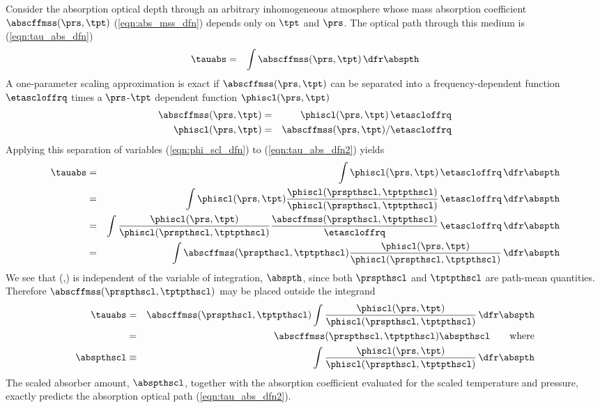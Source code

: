 \documentclass[12pt]{article}
\begin{document}
Consider the absorption optical depth through an arbitrary
inhomogeneous atmosphere whose mass absorption coefficient
$\abscffmss(\prs,\tpt)$ (\ref{eqn:abs_mss_dfn}) depends only on $\tpt$ 
and $\prs$. 
The optical path through this medium is (\ref{eqn:tau_abs_dfn})
\begin{eqnarray}
\tauabs & = & \int \abscffmss(\prs,\tpt) \,\dfr\abspth
\label{eqn:tau_abs_dfn2}
\end{eqnarray}
A one-parameter scaling approximation is exact if
$\abscffmss(\prs,\tpt)$ can be separated into a frequency-dependent
function $\etascloffrq$ times a $\prs$-$\tpt$ dependent function
$\phiscl(\prs,\tpt)$ \cite[][p.~224]{GoY89}
\begin{eqnarray}
\abscffmss(\prs,\tpt) & = & \phiscl(\prs,\tpt) \, \etascloffrq \nonumber \\
\phiscl(\prs,\tpt) & = & \abscffmss(\prs,\tpt) / \etascloffrq
\label{eqn:phi_scl_dfn}
\end{eqnarray}
Applying this separation of variables (\ref{eqn:phi_scl_dfn}) to
(\ref{eqn:tau_abs_dfn2}) yields
\begin{eqnarray}
\tauabs & = & \int \phiscl(\prs,\tpt) \, \etascloffrq \,\dfr\abspth \nonumber \\
& = & \int \phiscl(\prs,\tpt) 
\frac{\phiscl(\prspthscl,\tptpthscl)}{\phiscl(\prspthscl,\tptpthscl)}
\, \etascloffrq \,\dfr\abspth
\nonumber \\
& = & \int 
\frac{\phiscl(\prs,\tpt)}{\phiscl(\prspthscl,\tptpthscl)}
\frac{\abscffmss(\prspthscl,\tptpthscl)}{\etascloffrq}
\, \etascloffrq \,\dfr\abspth
\nonumber \\
& = & \int 
\abscffmss(\prspthscl,\tptpthscl)
\frac{\phiscl(\prs,\tpt)}{\phiscl(\prspthscl,\tptpthscl)}
\,\dfr\abspth \nonumber
\end{eqnarray}
We see that \abscffmss(\prspthscl,\tptpthscl) is independent of the 
variable of integration, $\abspth$, since both $\prspthscl$ and
$\tptpthscl$ are path-mean quantities.
Therefore $\abscffmss(\prspthscl,\tptpthscl)$ may be placed outside
the integrand 
\begin{eqnarray}
\tauabs
& = & 
\abscffmss(\prspthscl,\tptpthscl) 
\int \frac{\phiscl(\prs,\tpt)}{\phiscl(\prspthscl,\tptpthscl)} \,\dfr\abspth
\nonumber \\
& = & 
\abscffmss(\prspthscl,\tptpthscl) \abspthscl \qquad \mbox{where} \nonumber \\
\abspthscl & \equiv & 
\int \frac{\phiscl(\prs,\tpt)}{\phiscl(\prspthscl,\tptpthscl)} \,\dfr\abspth
\label{eqn:abs_pth_scl_dfn}
\end{eqnarray}
The scaled absorber amount, $\abspthscl$, together with the absorption
coefficient evaluated for the scaled temperature and pressure, exactly
predicts the absorption optical path (\ref{eqn:tau_abs_dfn2}).
\end{document}
